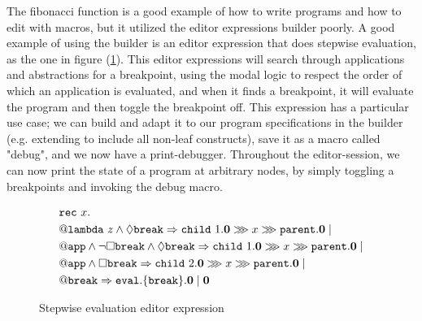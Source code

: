 The fibonacci function is a good example of how to write programs and how to
edit with macros, but it utilized the editor expressions builder poorly. A good
example of using the builder is an editor expression that does stepwise
evaluation, as the one in figure (\ref{fig:stepwiseEdt}). This editor
expressions will search through applications and abstractions for a breakpoint,
using the modal logic to respect the order of which an application is
evaluated, and when it finds a breakpoint, it will evaluate the program and
then toggle the breakpoint off. This expression has a particular use case; we
can build and adapt it to our program specifications in the builder (e.g.
extending to include all non-leaf constructs), save it as a macro called
"debug", and we now have a print-debugger. Throughout the editor-session, we
can now print the state of a program at arbitrary nodes, by simply toggling a
breakpoints and invoking the debug macro.

\begin{figure}[H]
\small
  \begin{align*}
     & \rec{x}{\\
     & \bicond{\conjunction{\at{\aamLambda{z}}}{\possibly{\aamBreak}}}{\seqcomp{\pre{\child{1}}{\nil}}{\seqcomp{\call{x}}{\pre{\parent}{\nil}}}}{\\
     & \bicond{\conjunction{\at{\aamApp}}{\conjunction{\neg{\necessarily{\aamBreak}}}{\possibly{\aamBreak}}}}{\seqcomp{\pre{\child{1}}{\nil}}{\seqcomp{\call{x}}{\pre{\parent}{\nil}}}}{\\
     & \bicond{\conjunction{\at{\aamApp}}{\necessarily{\aamBreak}}}{\seqcomp{\pre{\child{2}}{\nil}}{\seqcomp{\call{x}}{\pre{\parent}{\nil}}}}{\\
     & \bicond{\at{\aamBreak}}{\pre{\eval}{\pre{\sub{\aamBreak}}}{\nil}}{\nil}
                 }
             }
         }
     }
  \end{align*}
\caption{Stepwise evaluation editor expression}
  \label{fig:stepwiseEdt}
\end{figure}




